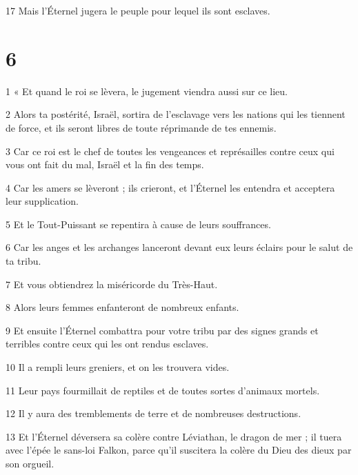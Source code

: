 \par 17 Mais l'Éternel jugera le peuple pour lequel ils sont esclaves.

\chapter{6}

\par 1 « Et quand le roi se lèvera, le jugement viendra aussi sur ce lieu.

\par 2 Alors ta postérité, Israël, sortira de l'esclavage vers les nations qui les tiennent de force, et ils seront libres de toute réprimande de tes ennemis.

\par 3 Car ce roi est le chef de toutes les vengeances et représailles contre ceux qui vous ont fait du mal, Israël et la fin des temps.

\par 4 Car les amers se lèveront ; ils crieront, et l'Éternel les entendra et acceptera leur supplication.

\par 5 Et le Tout-Puissant se repentira à cause de leurs souffrances.

\par 6 Car les anges et les archanges lanceront devant eux leurs éclairs pour le salut de ta tribu.

\par 7 Et vous obtiendrez la miséricorde du Très-Haut.

\par 8 Alors leurs femmes enfanteront de nombreux enfants.

\par 9 Et ensuite l'Éternel combattra pour votre tribu par des signes grands et terribles contre ceux qui les ont rendus esclaves.

\par 10 Il a rempli leurs greniers, et on les trouvera vides.

\par 11 Leur pays fourmillait de reptiles et de toutes sortes d'animaux mortels.

\par 12 Il y aura des tremblements de terre et de nombreuses destructions.

\par 13 Et l'Éternel déversera sa colère contre Léviathan, le dragon de mer ; il tuera avec l'épée le sans-loi Falkon, parce qu'il suscitera la colère du Dieu des dieux par son orgueil.

